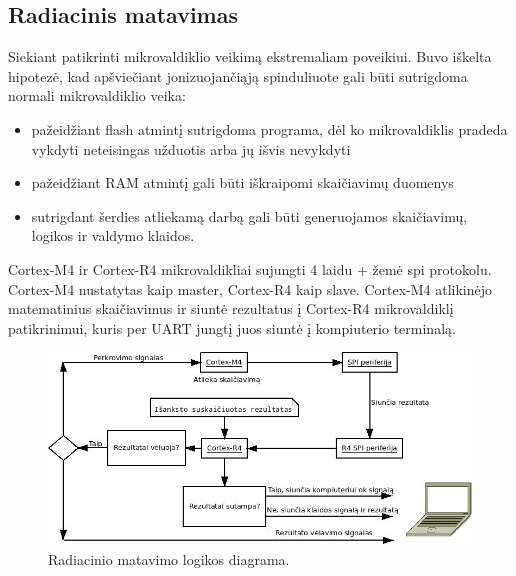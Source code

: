 \documentclass[a4paper, 12pt]{article} %
\begin{document}
\begin{onehalfspacing}
\subsection{Radiacinis matavimas}
Siekiant patikrinti mikrovaldiklio veikim\k{a} ekstremaliam poveikiui. Buvo i\v{s}kelta hipotez\.{e}, kad ap\v{s}vie\v{c}iant jonizuojan\v{c}i\k{a}j\k{a} spinduliuote gali b\={u}ti sutrigdoma normali mikrovaldiklio veika:
\begin{itemize}
\item pa\v{z}eid\v{z}iant flash atmint\k{i} sutrigdoma programa, d\.{e}l ko mikrovaldiklis pradeda vykdyti neteisingas u\v{z}duotis arba j\k{u} i\v{s}vis nevykdyti
\item pa\v{z}eid\v{z}iant RAM atmint\k{i} gali b\={u}ti i\v{s}kraipomi skai\v{c}iavim\k{u} duomenys
\item sutrigdant \v{s}erdies atliekam\k{a} darb\k{a} gali b\={u}ti generuojamos skai\v{c}iavim\k{u}, logikos ir valdymo klaidos.
\end{itemize} 
Cortex-M4 ir Cortex-R4 mikrovaldikliai sujungti 4 laidu + \v{z}em\.{e} spi protokolu. Cortex-M4 nustatytas kaip master, Cortex-R4 kaip slave.
Cortex-M4 atlikin\.{e}jo matematinius skai\v{c}iavimus ir siunt\.{e} rezultatus \k{i} Cortex-R4 mikrovaldikl\k{i} patikrinimui, kuris per UART jungt\k{i} juos siunt\.{e} \k{i} kompiuterio terminal\k{a}.  
\begin{figure}[H] %
\centering %
\includegraphics[scale=0.6]{pav/raddiag.jpg} %
\captionsetup{labelformat=numbfirst} %
\captionsetup{labelseparator=tarpas}
\caption{Radiacinio matavimo logikos diagrama.}
\label{vienas}
\end{figure}
\newpage
   

\end{onehalfspacing}
\end{document}

